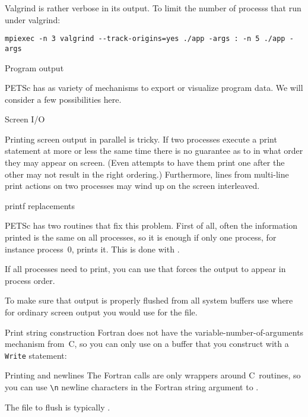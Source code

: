 Valgrind is rather verbose in its output.
To limit the number of processs that run under valgrind:
\begin{verbatim}
mpiexec -n 3 valgrind --track-origins=yes ./app -args : -n 5 ./app -args
\end{verbatim}

 {Program output}

PETSc has as variety of mechanisms to export or visualize program data.
We will consider a few possibilities here.

 {Screen I/O}

Printing screen output in parallel is tricky. If two processes execute
a print statement at more or less the same time there is no guarantee
as to in what order they may appear on screen. (Even attempts to have
them print one after the other may not result in the right ordering.)
Furthermore, lines from multi-line print actions on two processes may
wind up on the screen interleaved.

 {printf replacements}

PETSc has two routines that fix this problem. First of all, often the
information printed is the same on all processes, so it is enough if
only one process, for instance process~0, prints it. This is done with
.

If all processes need to print, you can use
 that forces the
output to appear in process order.

To make sure that output is properly flushed from all system buffers
use 
where for ordinary screen output you would use  for the file.

\begin{fortrannote}{Print string construction}
  Fortran does not have the variable-number-of-arguments mechanism
  from~C, so you can only use 
  on a buffer that you construct with a \lstinline{Write} statement:
\end{fortrannote}

\begin{fortrannote}{Printing and newlines}
  The Fortran calls are only wrappers around C~routines, so you can 
  use \verb+\n+ newline characters in the Fortran string argument
  to .

  The file to flush is typically .
\end{fortrannote}

